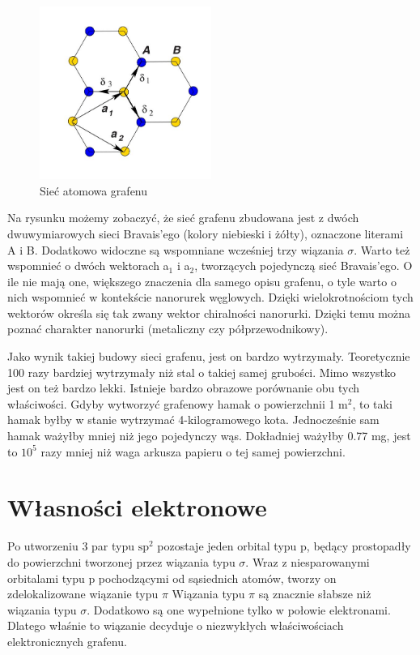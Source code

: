 	\vspace{-10pt}
	\begin{figure}[ht]
	\centering
	\includegraphics[width=0.50\textwidth]{./Rozdzial_2/obrazki/Siec_grafen.jpg}
	\caption{Sieć atomowa grafenu}
	\label{fig:siec_grafenu}
	\end{figure}
	\vspace{-10pt}

	Na rysunku możemy zobaczyć, że sieć grafenu zbudowana jest z dwóch dwuwymiarowych sieci Bravais'ego (kolory 
	niebieski i żółty), oznaczone literami A i B. Dodatkowo widoczne są wspomniane wcześniej trzy wiązania $\sigma$.
	Warto też wspomnieć o dwóch wektorach a$_1$ i a$_2$, tworzących pojedynczą sieć Bravais'ego. O ile nie mają one,
	większego znaczenia dla samego opisu grafenu, o tyle warto o nich wspomnieć w kontekście nanorurek węglowych. Dzięki
	wielokrotnościom tych wektorów określa się tak zwany wektor chiralności nanorurki. Dzięki temu można poznać charakter
	nanorurki (metaliczny czy półprzewodnikowy).
	
	Jako wynik takiej budowy sieci grafenu, jest on bardzo wytrzymały. Teoretycznie 100 razy bardziej wytrzymały niż
	stal o takiej samej grubości. Mimo wszystko jest on też bardzo lekki. Istnieje bardzo obrazowe
	porównanie obu tych właściwości. Gdyby wytworzyć grafenowy hamak o powierzchnii 1 m$^2$, to taki hamak byłby
	w stanie wytrzymać 4-kilogramowego kota. Jednocześnie sam hamak  ważyłby mniej niż jego pojedynczy wąs. 
	Dokładniej ważyłby 0.77 mg, jest to $10^{5}$ razy mniej niż waga arkusza papieru o tej samej powierzchni.

\section{Własności elektronowe}
	Po utworzeniu 3 par typu $\mathrm{sp^2}$ pozostaje jeden orbital typu p, będący prostopadły do
	powierzchni tworzonej przez wiązania typu $\sigma$. Wraz z niesparowanymi orbitalami typu p pochodzącymi od
	 sąsiednich atomów,  tworzy on zdelokalizowane wiązanie typu $\pi$
	Wiązania typu $\pi$ są znacznie słabsze niż wiązania typu $\sigma$. Dodatkowo są one 
	wypełnione tylko w połowie elektronami. Dlatego właśnie to wiązanie decyduje o niezwykłych właściwościach 
	elektronicznych grafenu.

